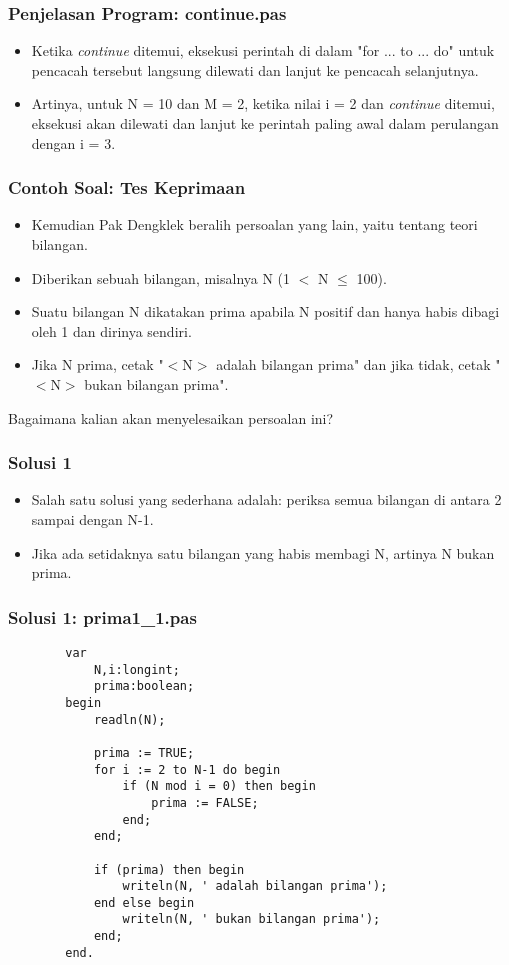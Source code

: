 \documentclass{beamer}
\begin{document}
\begin{frame}
\frametitle{Penjelasan Program: continue.pas}
\begin{itemize}
	\item Ketika \textit{continue} ditemui, eksekusi perintah di dalam "for ... to ... do" untuk pencacah tersebut langsung dilewati dan lanjut ke pencacah selanjutnya.
	\item Artinya, untuk N = 10 dan M = 2, ketika nilai i = 2 dan \textit{continue} ditemui, eksekusi akan dilewati dan lanjut ke perintah paling awal dalam perulangan dengan i = 3. 
\end{itemize}
\end{frame}


\begin{frame}
\frametitle{Contoh Soal: Tes Keprimaan}
\begin{itemize}
	\item Kemudian Pak Dengklek beralih persoalan yang lain, yaitu tentang teori bilangan.
	\item Diberikan sebuah bilangan, misalnya N (1 $<$ N $\leq$ 100).
	\item Suatu bilangan N dikatakan prima apabila N positif dan hanya habis dibagi oleh 1 dan dirinya sendiri.
	\item Jika N prima, cetak "$<$N$>$ adalah bilangan prima" dan jika tidak, cetak "$<$N$>$ bukan bilangan prima".
\end{itemize}
Bagaimana kalian akan menyelesaikan persoalan ini?
\end{frame}

\begin{frame}
\frametitle{Solusi 1}
\begin{itemize}
	\item Salah satu solusi yang sederhana adalah: periksa semua bilangan di antara 2 sampai dengan N-1.
	\item Jika ada setidaknya satu bilangan yang habis membagi N, artinya N bukan prima.
\end{itemize}
\end{frame}


\begin{frame}[fragile]
\frametitle{Solusi 1: prima1\_1.pas}
	\begin{lstlisting}
		var
		    N,i:longint;
		    prima:boolean;
		begin
		    readln(N);
		
		    prima := TRUE;
		    for i := 2 to N-1 do begin
		        if (N mod i = 0) then begin
		            prima := FALSE;
		        end;
		    end;
		
		    if (prima) then begin
		        writeln(N, ' adalah bilangan prima');
		    end else begin
		        writeln(N, ' bukan bilangan prima');
		    end;
		end.
	\end{lstlisting}
\end{frame}
\end{document}
